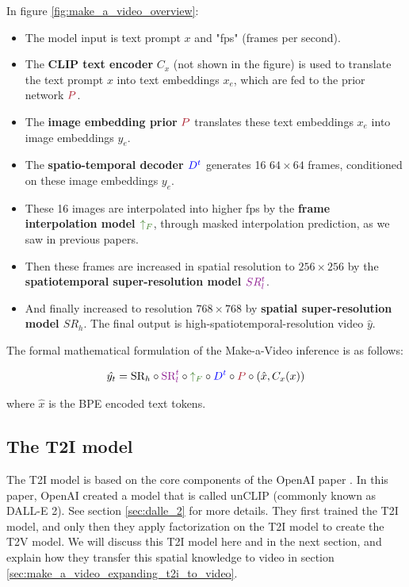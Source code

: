 In figure \ref{fig:make_a_video_overview}:

\begin{itemize}
    \item The model input is text prompt $x$ and "fps" (frames per second).
    \item The \textbf{CLIP text encoder} $C_x$ (not shown in the figure) is used to translate the text prompt $x$ into text embeddings $x_e$, which are fed to the prior network $\textcolor{Maroon}{P}$.
    \item The \textbf{image embedding prior} $\textcolor{Maroon}{P}$ translates these text embeddings $x_e$ into image embeddings $y_e$.
    \item The \textbf{spatio-temporal decoder $\textcolor{blue}{D^t}$} generates 16 $64\times 64$ frames, conditioned on these image embeddings $y_e$.
    \item These 16 images are interpolated into higher fps by the \textbf{frame interpolation model $\textcolor{OliveGreen}{\uparrow_F}$}, through masked interpolation prediction, as we saw in previous papers.
    \item Then these frames are increased in spatial resolution to $256\times 256$ by the \textbf{spatiotemporal super-resolution model $\textcolor{Plum}{SR_l^t}$}.
    \item And finally increased to resolution $768\times 768$ by \textbf{spatial super-resolution model $SR_h$}. The final output is high-spatiotemporal-resolution video $\hat{y}$.
\end{itemize}

The formal mathematical formulation of the Make-a-Video inference is as follows:

\begin{equation}
    \hat{y_t} = \text{SR}_h \circ \textcolor{Plum}{\text{SR}_l^t} \circ \textcolor{OliveGreen}{\uparrow_F} \circ \textcolor{blue}{D^t} \circ \textcolor{Maroon}{P} \circ \left( \hat{x}, C_x (x) \right)
    \label{eq:make_a_video_inference}
\end{equation}

where $\hat{x}$ is the BPE encoded text tokens.







\subsection{The T2I model}

The T2I model is based on the core components of the OpenAI paper \cite{dalle_2}. In this paper, OpenAI created a model that is called unCLIP (commonly known as DALL-E 2). See section \ref{sec:dalle_2} for more details. They first trained the T2I model, and only then they apply factorization on the T2I model to create the T2V model. We will discuss this T2I model here and in the next section, and explain how they transfer this spatial knowledge to video in section \ref{sec:make_a_video_expanding_t2i_to_video}.

